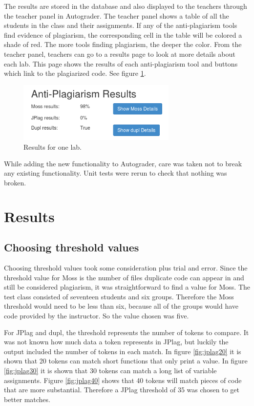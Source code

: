 \documentclass[10pt,journal,compsoc]{IEEEtran}
\begin{document}
		The results are stored in the database and also displayed to the teachers through the teacher panel in Autograder. The teacher panel shows a table of all the students in the class and their assignments. If any of the anti-plagiarism tools find evidence of plagiarism, the corresponding cell in the table will be colored a shade of red. The more tools finding plagiarism, the deeper the color. From the teacher panel, teachers can go to a results page to look at more details about each lab. This page shows the results of each anti-plagiarism tool and buttons which link to the plagiarized code. See figure \ref{fig:labresults}.
		
		\begin{figure}[h!]
			\includegraphics[width=0.7\textwidth]{LabResults.png}
			\caption{Results for one lab.}
			\label{fig:labresults}
		\end{figure}
		
		While adding the new functionality to Autograder, care was taken not to break any existing functionality. Unit tests were rerun to check that nothing was broken.
		
	\section{Results}
	
		\subsection{Choosing threshold values}
		Choosing threshold values took some consideration plus trial and error. Since the threshold value for Moss is the number of files duplicate code can appear in and still be considered plagiarism, it was straightforward to find a value for Moss. The test class consisted of seventeen students and six groups. Therefore the Moss threshold would need to be less than six, because all of the groups would have code provided by the instructor. So the value chosen was five.
		
		For JPlag and dupl, the threshold represents the number of tokens to compare. It was not known how much data a token represents in JPlag, but luckily the output included the number of tokens in each match. In figure \ref{fig:jplag20} it is shown that 20 tokens can match short functions that only print a value. In figure \ref{fig:jplag30} it is shown that 30 tokens can match a long list of variable assignments. Figure \ref{fig:jplag40} shows that 40 tokens will match pieces of code that are more substantial. Therefore a JPlag threshold of 35 was chosen to get better matches.
		
\end{document}
